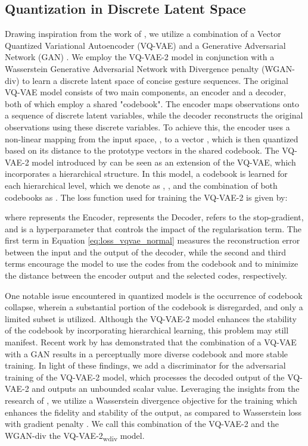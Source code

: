 \documentclass[sigconf]{acmart}
\begin{document}
\subsection{Quantization in Discrete Latent Space} \label{discrete_latent}
Drawing inspiration from the work of \citet{esserTamingTransformersHighResolution2021}, we utilize a combination of a Vector Quantized Variational Autoencoder (VQ-VAE) \cite{van2017neural} and a Generative Adversarial Network (GAN) \cite{goodfellow2020generative,liu2019acceleration}. We employ the VQ-VAE-2 model \cite{razavi2019generating} in conjunction with a Wasserstein Generative Adversarial Network with Divergence penalty (WGAN-div)  \cite{wu2018wasserstein} to learn a discrete latent space of concise gesture sequences.
The original VQ-VAE model \cite{van2017neural} consists of two main components, an encoder and a decoder, both of which employ a shared "codebook". The encoder maps observations onto a sequence of discrete latent variables, while the decoder reconstructs the original observations using these discrete variables. To achieve this, the encoder uses a non-linear mapping from the input space, , to a vector , which is then quantized based on its distance to the prototype vectors  in the shared codebook. 
The VQ-VAE-2 model introduced by \citet{razavi2019generating} can be seen as an extension of the VQ-VAE, which incorporates a hierarchical structure. In this model, a codebook is learned for each hierarchical level, which we denote as , , and the combination of both codebooks as . The loss function used for training the VQ-VAE-2 is given by:

where  represents the Encoder,  represents the Decoder,  refers to the stop-gradient, and  is a hyperparameter that controls the impact of the regularisation term. The first term in Equation \ref{eq:loss_vqvae_normal} measures the reconstruction error between the input and the output of the decoder, while the second and third terms encourage the model to use the codes from the codebook and to minimize the distance between the encoder output and the selected codes, respectively.

One notable issue encountered in quantized models is the occurrence of codebook collapse, wherein a substantial portion of the codebook is disregarded, and only a limited subset is utilized. Although the VQ-VAE-2 model enhances the stability of the codebook by incorporating hierarchical learning, this problem may still manifest. Recent work by \citet{esserTamingTransformersHighResolution2021} has demonstrated that the combination of a VQ-VAE with a GAN results in a perceptually more diverse codebook and more stable training. In light of these findings, we add a discriminator for the adversarial training of the VQ-VAE-2 model, which processes the decoded output of the VQ-VAE-2 and outputs an unbounded scalar value. Leveraging the insights from the research of \citet{wu2018wasserstein}, we utilize a Wasserstein divergence objective for the training which enhances the fidelity and stability of the output, as compared to Wasserstein loss with gradient penalty \cite{gulrajani2017improved}. We call this combination of the VQ-VAE-2 and the WGAN-div the VQ-VAE-2\textsubscript{wdiv} model.
\end{document}
